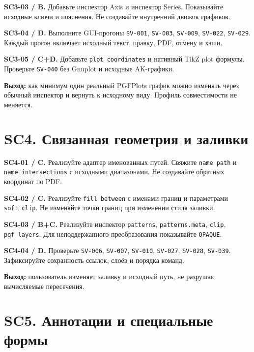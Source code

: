 \documentclass[11pt,a4paper,oneside]{scrreprt}
\begin{document}
\textbf{SC3-03 / B.} Добавьте инспектор Axis и инспектор Series. Показывайте исходные ключи и пояснения. Не создавайте внутренний движок графиков.

\textbf{SC3-04 / D.} Выполните GUI-прогоны \texttt{SV-001}, \texttt{SV-003}, \texttt{SV-009}, \texttt{SV-022}, \texttt{SV-029}. Каждый прогон включает исходный текст, правку, PDF, отмену и хэши.

\textbf{SC3-05 / C+D.} Добавьте \texttt{plot\ coordinates} и нативный TikZ plot формулы. Проверьте \texttt{SV-040} без Gnuplot и исходные AK-графики.

\textbf{Выход:} как минимум один реальный PGFPlots график можно изменять через обычный инспектор и вернуть к исходному виду. Профиль совместимости не меняется.

\section{SC4. Связанная геометрия и заливки}\label{sc4.-ux441ux432ux44fux437ux430ux43dux43dux430ux44f-ux433ux435ux43eux43cux435ux442ux440ux438ux44f-ux438-ux437ux430ux43bux438ux432ux43aux438}

\textbf{SC4-01 / C.} Реализуйте адаптер именованных путей. Свяжите \texttt{name\ path} и \texttt{name\ intersections} с исходными диапазонами. Не создавайте обратных координат по PDF.

\textbf{SC4-02 / C.} Реализуйте \texttt{fill\ between} с именами границ и параметрами \texttt{soft\ clip}. Не изменяйте точки границ при изменении стиля заливки.

\textbf{SC4-03 / B+C.} Реализуйте инспектор \texttt{patterns}, \texttt{patterns.meta}, \texttt{clip}, \texttt{pgf\ layers}. Для неподдержанного преобразования показывайте \texttt{OPAQUE}.

\textbf{SC4-04 / D.} Проверьте \texttt{SV-006}, \texttt{SV-007}, \texttt{SV-010}, \texttt{SV-027}, \texttt{SV-028}, \texttt{SV-039}. Зафиксируйте сохранность ссылок, слоёв и порядка команд.

\textbf{Выход:} пользователь изменяет заливку и исходный путь, не разрушая вычисляемые пересечения.

\section{SC5. Аннотации и специальные формы}\label{sc5.-ux430ux43dux43dux43eux442ux430ux446ux438ux438-ux438-ux441ux43fux435ux446ux438ux430ux43bux44cux43dux44bux435-ux444ux43eux440ux43cux44b}
\end{document}
